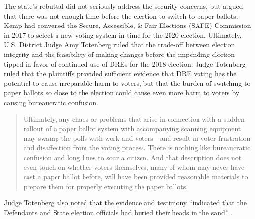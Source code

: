 \documentclass[runningheads]{llncs}
\begin{document}
The state's rebuttal did not seriously address the security concerns,
but argued that there was not enough time before the election to switch to paper ballots.
Kemp had convened the Secure, Accessible, \& Fair Elections (SAFE)
Commission in 2017 to select a new voting system in time for the 2020 election.
Ultimately, U.S. District Judge Amy Totenberg ruled that the trade-off between election integrity and the feasibility
 of making changes before the impending election tipped in favor of continued use of DREs for the 2018
 election.
Judge Totenberg ruled that the plaintiffs provided sufficient evidence that DRE voting
has the potential to cause irreparable harm to voters, but that
the burden of switching to paper ballots so close to the election could cause even more harm to voters by causing bureaucratic confusion.

\begin{quote}
Ultimately, any chaos or problems that arise in connection with a sudden rollout of a paper ballot system with
accompanying scanning equipment may swamp the polls with work and voters---and result in voter frustration and disaffection from the voting process.
There is nothing like bureaucratic confusion and long lines to sour a citizen.
And that description does not even touch on whether voters themselves,
many of whom may never have cast a paper ballot before,
will have been provided reasonable materials to prepare them for properly executing the paper ballots.
\end{quote}

\noindent Judge Totenberg also noted that the evidence and testimony 
``indicated that the Defendants and State election officials had buried their heads in the sand'' \cite{curling_kemp_2018}.

\end{document}
